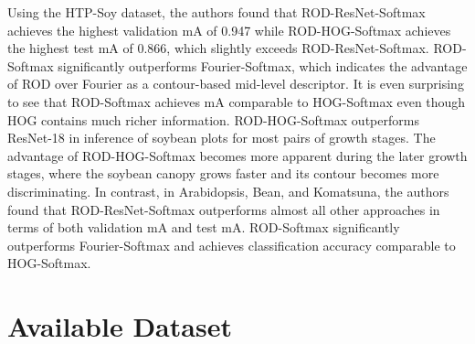 Using the HTP-Soy dataset, the authors found that ROD-ResNet-Softmax achieves the highest validation mA of 0.947 while ROD-HOG-Softmax achieves the highest test mA
of 0.866, which slightly exceeds ROD-ResNet-Softmax. ROD-Softmax significantly outperforms Fourier-Softmax, which indicates the advantage of ROD over Fourier as a
contour-based mid-level descriptor. It is even surprising to see that ROD-Softmax achieves mA comparable to HOG-Softmax even though HOG contains much richer information.
ROD-HOG-Softmax outperforms ResNet-18 in inference of soybean plots for most pairs of growth stages. The advantage of ROD-HOG-Softmax becomes more apparent during the
later growth stages, where the soybean canopy grows faster and its contour becomes more discriminating. In contrast, in Arabidopsis, Bean, and Komatsuna, the authors
found that ROD-ResNet-Softmax outperforms almost all other approaches in terms of both validation mA and test mA. ROD-Softmax significantly outperforms Fourier-Softmax
and achieves classification accuracy comparable to HOG-Softmax.



 










\section{Available Dataset}

